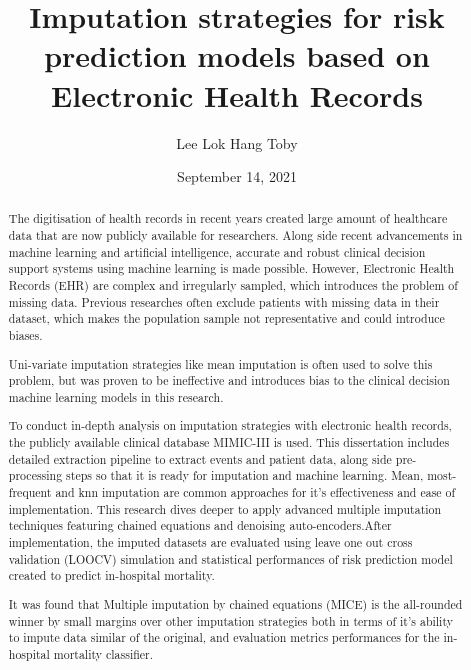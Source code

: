 \documentclass{l4proj}
\begin{document}
\title{Imputation strategies for risk prediction models based on Electronic Health Records}
\author{Lee Lok Hang Toby}
\date{September 14, 2021}

\maketitle

\begin{abstract}


    The digitisation of health records in recent years created large amount of healthcare data that are now publicly available for researchers. Along side recent advancements in machine learning and artificial intelligence, accurate and robust clinical decision support systems using machine learning is made possible. However, Electronic Health Records (EHR) are complex and irregularly sampled, which introduces the problem of missing data. Previous researches often exclude patients with missing data in their dataset, which makes the population sample not representative and could introduce biases.
    
    Uni-variate imputation strategies like mean imputation is often used to solve this problem, but was proven to be ineffective and introduces bias to the clinical decision machine learning models in this research. 
    
    To conduct in-depth analysis on imputation strategies with electronic health records, the publicly available clinical database MIMIC-III is used. This dissertation includes detailed extraction pipeline to extract events and patient data, along side pre-processing steps so that it is ready for imputation and machine learning. Mean, most-frequent and knn imputation are common approaches for it's effectiveness and ease of implementation. This research dives deeper to apply advanced multiple imputation techniques featuring chained equations and denoising auto-encoders.After implementation, the imputed datasets are evaluated using leave one out cross validation (LOOCV) simulation and statistical performances of risk prediction model created to predict in-hospital mortality.
    
    It was found that Multiple imputation by chained equations (MICE) is the all-rounded winner by small margins over other imputation strategies both in terms of it's ability to impute data similar of the original, and evaluation metrics performances for the in-hospital mortality classifier. 
    
    
    
\end{abstract}
\end{document}
